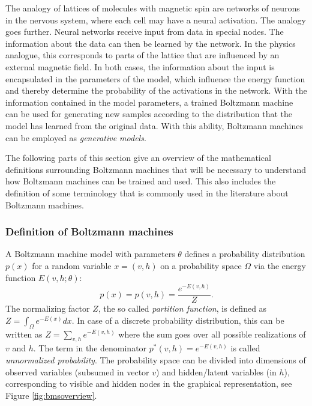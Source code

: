 \documentclass[12pt]{article}
\begin{document}
The analogy of lattices of molecules with magnetic spin are networks of neurons in the nervous system, where each cell may have a neural activation.
The analogy goes further.
Neural networks receive input from data in special nodes.
The information about the data can then be learned by the network.
In the physics analogue, this corresponds to parts of the lattice that are influenced by an external magnetic field.
In both cases, the information about the input is encapsulated in the parameters of the model, which influence the energy function and thereby determine the probability of the activations in the network.
With the information contained in the model parameters, a trained Boltzmann machine can be used for generating new samples according to the distribution that the model has learned from the original data.
With this ability, Boltzmann machines can be employed as {\em generative models}.

The following parts of this section give an overview of the mathematical definitions surrounding Boltzmann machines that will be necessary to understand how Boltzmann machines can be trained and used.
This also includes the definition of some terminology that is commonly used in the literature about Boltzmann machines.

\subsubsection{Definition of Boltzmann machines}\label{basicbmproperties}

A Boltzmann machine model with parameters $\theta$ defines a probability distribution $p(x)$ for a random variable $x = (v, h)$ on a probability space $\Omega$ via the energy function $E(v, h; \theta)$:
\begin{equation}
   p(x) = p(v, h) = \frac{e^{-E(v,h)}}{Z}.
   \label{eqn:probbm}
\end{equation}
The normalizing factor $Z$, the so called \emph{partition function}, is defined as $Z = \int_{\Omega} e^{-E(x)} dx$.
In case of a discrete probability distribution, this can be written as $Z = \sum_{v,h}e^{-E(v,h)}$ where the sum goes over all possible realizations of $v$ and $h$.
The term in the denominator $p^*(v,h) = e^{-E(v,h)}$ is called \emph{unnormalized probability}.
The probability space can be divided into dimensions of observed variables (subsumed in vector $v$) and hidden/latent variables (in $h$), corresponding to visible and hidden nodes in the graphical representation, see Figure \ref{fig:bmsoverview}.
\end{document}
